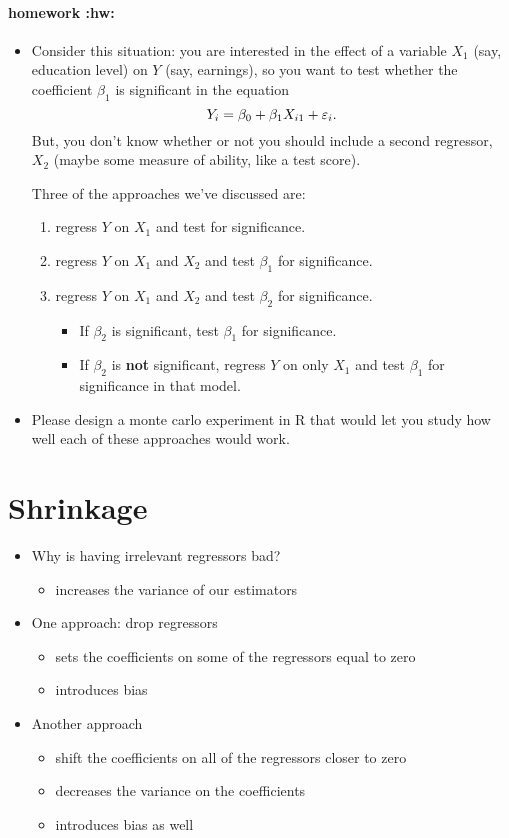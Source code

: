 \paragraph{homework \textbf{:hw:}}
\begin{itemize}
\item Consider this situation: you are interested in the effect of a
        variable $X_1$ (say, education level) on $Y$ (say, earnings),
        so you want to test whether the coefficient $\beta_1$ is
        significant in the equation
        \[ Y_{i} = \beta_0 + \beta_1 X_{i1} + \varepsilon_i. \]
        But, you don't know whether or not you should include a second
        regressor, $X_2$ (maybe some measure of ability, like a test
        score).

        Three of the approaches we've discussed are:
\begin{enumerate}
\item regress $Y$ on $X_1$ and test for significance.
\item regress $Y$ on $X_1$ and $X_2$ and test $\beta_1$ for
           significance.
\item regress $Y$ on $X_1$ and $X_2$ and test $\beta_2$ for
           significance.
\begin{itemize}
\item If $\beta_2$ is significant, test $\beta_1$ for
             significance.
\item If $\beta_2$ is \textbf{not} significant, regress $Y$ on only
             $X_1$ and test $\beta_1$ for significance in that
             model.
\end{itemize}
\end{enumerate}
\item Please design a monte carlo experiment in R that would let you
        study how well each of these approaches would work.
\end{itemize}

\section{Shrinkage}
\begin{itemize}
\item Why is having irrelevant regressors bad?
\begin{itemize}
\item increases the variance of our estimators
\end{itemize}
\item One approach: drop regressors
\begin{itemize}
\item sets the coefficients on some of the regressors equal to zero
\item introduces bias
\end{itemize}
\item Another approach
\begin{itemize}
\item shift the coefficients on all of the regressors closer to zero
\item decreases the variance on the coefficients
\item introduces bias as well
\end{itemize}
\end{itemize}

